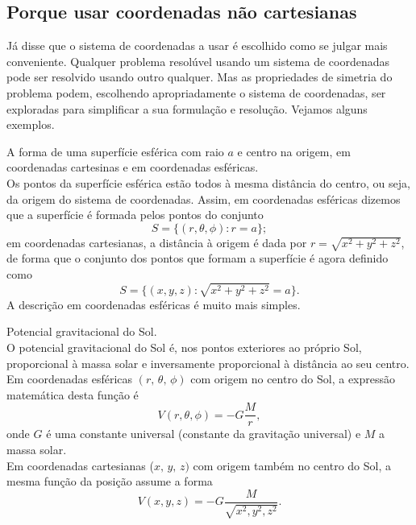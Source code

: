 \subsection{Porque usar coordenadas não cartesianas}
Já disse que o sistema de coordenadas a usar é escolhido como se julgar mais
conveniente. Qualquer problema resolúvel usando um sistema de coordenadas pode
ser resolvido usando outro qualquer. Mas as propriedades de simetria do problema
podem, escolhendo apropriadamente o sistema de coordenadas, ser exploradas para
simplificar a sua formulação e resolução. Vejamos alguns exemplos.
\begin{examples}
\item A forma de uma superfície esférica com raio $a$ e centro na origem, em
  coordenadas cartesinas e em coordenadas esféricas.\\
  Os pontos da superfície esférica estão todos à mesma distância do centro, ou
  seja, da origem do sistema de coordenadas. Assim, em coordenadas esféricas
  dizemos que a superfície é formada pelos pontos do conjunto
  \begin{equation*}
    S=\{(r,\theta,\phi): r=a\};
  \end{equation*}
  em coordenadas cartesianas, a distância à origem é dada por
  $r=\sqrt{x^2+y^2+z^2}$, de forma que o conjunto dos pontos que formam a
  superfície é agora definido como
  \begin{equation*}
    S=\{(x,y,z): \sqrt{x^2+y^2+z^2}=a\}.
  \end{equation*}
  A descrição em coordenadas esféricas é muito mais simples.
\item
  Potencial gravitacional do Sol.\\
  O potencial gravitacional do Sol é, nos pontos exteriores ao próprio Sol,
  proporcional à massa solar e inversamente proporcional à distância ao seu
  centro. Em coordenadas esféricas $(r,\,\theta,\,\phi)$ com origem no centro do
  Sol, a expressão matemática desta função é
  \begin{equation*}
    V(r,\theta,\phi)=-G\frac{M}{r},
  \end{equation*}
  onde $G$ é uma constante universal (constante da gravitação universal) e $M$ a
  massa solar.\\
  Em coordenadas cartesianas ($x,\,y,\,z)$ com origem também no centro do Sol, a
  mesma função da posição assume a forma
  \begin{equation*}
    V(x,y,z)=-G\frac{M}{\sqrt{x^2,y^2,z^2}}.
  \end{equation*}

\end{examples}
